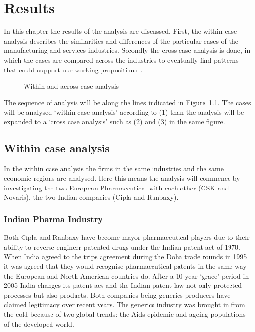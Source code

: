 \chapter{Results}\label{ch:Result}%
In this chapter the results of the analysis are discussed.
First, the within-case analysis describes the similarities and differences of the particular cases of the manufacturing and services industries.
Secondly the cross-case analysis is done, in which the cases are compared across the industries to eventually find patterns that could support our working propositions~\cite{Eisenhardt:1989ww}.

\begin{figure}
\centering
{}
 \caption{Within and across case analysis}\label{fig:Case_Analysis}
\end{figure}

The sequence of analysis will be along the lines indicated in Figure~\ref{fig:Case_Analysis}.
The cases will be analysed `within case analysis' according to (1) than the analysis will be expanded to a `cross case analysis' such as (2) and (3) in the same figure.

\section{Within case analysis}%

In the within case analysis the firms in the same industries and the same economic regions are analysed. 
Here this means the analysis will commence by investigating the two European Pharmaceutical with each other (GSK and Novaris), the two Indian \pharma companies (Cipla and Ranbaxy).

\subsection{Indian Pharma Industry}

Both Cipla and Ranbaxy have become mayor pharmaceutical players due to their ability to reverse engineer patented drugs under the Indian patent act of 1970.
When India agreed to the \gls{trips} agreement during the Doha trade rounds in 1995 it was agreed that they would recognise pharmaceutical patents in the same way the European and North American countries do.
After a 10 year `grace' period in 2005 India changes its patent act and the Indian patent law not only protected processes but also products.
Both companies being generics producers have claimed legitimacy over recent years. The generics industry was brought in from the cold because of two global trends: the Aids epidemic and ageing populations of the developed world.%

